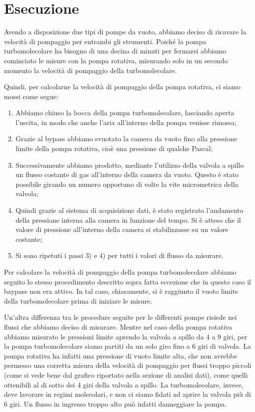 \section{Esecuzione}

Avendo a disposizione due tipi di pompe da vuoto, abbiamo deciso di ricavare la velocità di pompaggio per entrambi gli strumenti.
Poiché la pompa turbomolecolare ha bisogno di una decina di minuti per fermarsi abbiamo cominciato le misure con la pompa rotativa,
misurando solo in un secondo momento la velocità di pompaggio della turbomolecolare.

Quindi, per calcolarne la velocità di pompaggio della pompa rotativa, ci siamo mossi come segue:

\begin{enumerate}
	\item{Abbiamo chiuso la bocca della pompa turbomolecolare, lasciando aperta l'uscita,
        in modo che anche l'aria all'interno della pompa venisse rimossa;}
	\item{Grazie al bypass abbiamo svuotato la camera da vuoto fino alla pressione limite della pompa rotativa, cioè una pressione di qualche Pascal;}
	\item{Successivamente abbiamo prodotto, mediante l'utilizzo della valvola a spillo un flusso costante di gas all'interno della camera da vuoto. Questo è stato possibile girando un numero opportuno di volte la vite micrometrica della valvola;}
	\item{Quindi grazie al sistema di acquisizione dati, è stato registrato l'andamento della pressione interna alla camera in funzione del tempo.  Si è atteso che il valore di pressione all'interno della camera si stabilizzasse su un valore costante;}
	\item{Si sono ripetuti i passi 3) e 4) per tutti i valori di flusso da misurare.}
\end{enumerate}

Per calcolare la velocità di pompaggio della pompa turbomolecolare abbiamo seguito lo stesso procedimento
descritto sopra fatta eccezione che in questo caso il baypass non era attivo. In tal caso, chiaramente,
si è raggiunto il vuoto limite della turbomolecolare prima di iniziare le misure.

Un'altra differenza tra le procedure seguite per le differenti pompe risiede nei flussi che abbiamo deciso di misurare.
Mentre nel caso della pompa rotativa abbiamo misurato le pressioni limite aprendo la valvola a spillo da 4 a 9 giri,
per la pompa turbomolecolare siamo partiti da un solo giro fino a 6 giri di valvola.
La pompa rotativa ha infatti una pressione di vuoto limite alta, che non avrebbe permesso
una corretta misura della velocità di pompaggio per flussi troppo piccoli (come si vede bene dal grafico
riportato nella sezione di analisi dati), come quelli ottenibili al di sotto dei 4 giri della valvola a spillo.
La turbomolecolare, invece, deve lavorare in regimi molecolari, e non ci siamo fidati ad aprire la valvola più di 6 giri.
Un flusso in ingresso troppo alto può infatti danneggiare la pompa. 

